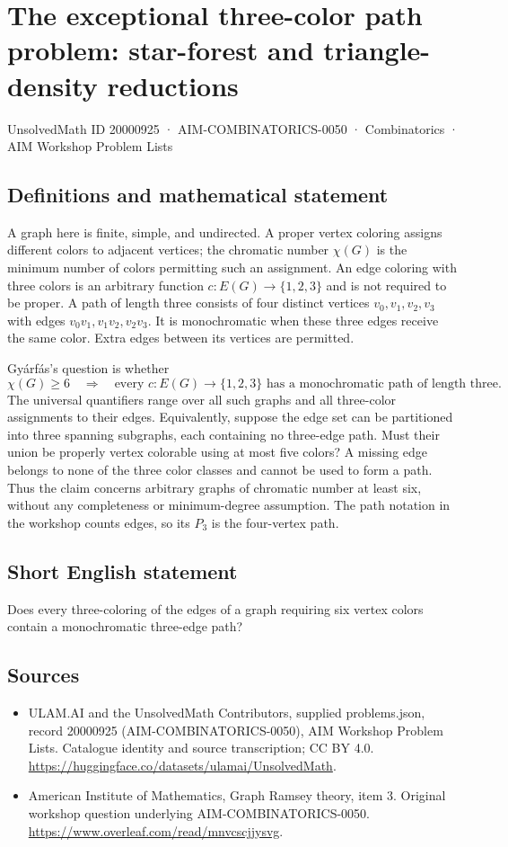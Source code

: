 \documentclass[11pt,a4paper]{article}
\begin{document}
\section*{The exceptional three-color path problem: star-forest and triangle-density reductions}\label{20000925}
{\small UnsolvedMath ID 20000925 · AIM-COMBINATORICS-0050 · Combinatorics · AIM Workshop Problem Lists}
\subsection{Definitions and mathematical statement}
A graph here is finite, simple, and undirected. A proper vertex coloring
assigns different colors to adjacent vertices; the chromatic number
$\chi(G)$ is the minimum number of colors permitting such an assignment.
An edge coloring with three colors is an arbitrary function
$c:E(G)\to\{1,2,3\}$ and is not required to be proper.
A path of length three consists of four distinct vertices
$v_0,v_1,v_2,v_3$ with edges $v_0v_1,v_1v_2,v_2v_3$.
It is monochromatic when these three edges receive the same color.
Extra edges between its vertices are permitted.

Gy\'arf\'as's question is whether
\[
 \chi(G)\ge6\quad\Longrightarrow\quad
 \text{every }c:E(G)\to\{1,2,3\}
 \text{ has a monochromatic path of length three}.
\]
The universal quantifiers range over all such graphs and all three-color
assignments to their edges. Equivalently, suppose the edge set can be
partitioned into three spanning subgraphs, each containing no
three-edge path. Must their union be properly vertex colorable using
at most five colors? A missing edge belongs to none of the three color
classes and cannot be used to form a path. Thus the claim concerns
arbitrary graphs of chromatic number at least six, without any
completeness or minimum-degree assumption. The path notation in the
workshop counts edges, so its $P_3$ is the four-vertex path.
\subsection{Short English statement}
Does every three-coloring of the edges of a graph requiring six vertex colors contain a monochromatic three-edge path?
\subsection{Sources}
\begin{itemize}
\item[S1] ULAM.AI and the UnsolvedMath Contributors, supplied problems.json, record 20000925 (AIM-COMBINATORICS-0050), AIM Workshop Problem Lists. Catalogue identity and source transcription; CC BY 4.0.
\url{https://huggingface.co/datasets/ulamai/UnsolvedMath}.
\item[S2] American Institute of Mathematics, Graph Ramsey theory, item 3. Original workshop question underlying AIM-COMBINATORICS-0050.
\url{https://www.overleaf.com/read/mnvcscjjysvg}.
\end{itemize}
\end{document}
